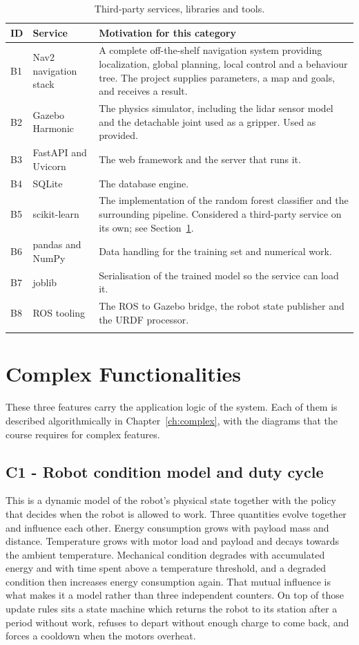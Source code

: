 \documentclass[12pt,a4paper]{report}
\begin{document}
\begin{longtable}{@{}p{}p{}p{}@{}}
\toprule
\textbf{ID} & \textbf{Service} & \textbf{Motivation for this category} \\
\midrule
\endhead
B1 & Nav2 navigation stack & A complete off-the-shelf navigation system providing localization,
global planning, local control and a behaviour tree. The project supplies parameters, a map and
goals, and receives a result. \\
B2 & Gazebo Harmonic & The physics simulator, including the lidar sensor model and the detachable
joint used as a gripper. Used as provided. \\
B3 & FastAPI and Uvicorn & The web framework and the server that runs it. \\
B4 & SQLite & The database engine. \\
B5 & scikit-learn & The implementation of the random forest classifier and the surrounding
pipeline. Considered a third-party service on its own; see
Section~\ref{sec:cat-complex}. \\
B6 & pandas and NumPy & Data handling for the training set and numerical work. \\
B7 & joblib & Serialisation of the trained model so the service can load it. \\
B8 & ROS tooling & The ROS to Gazebo bridge, the robot state publisher and the URDF processor. \\
\bottomrule
\caption{Third-party services, libraries and tools.}
\label{tab:cat-b}
\end{longtable}

\section{Complex Functionalities}
\label{sec:cat-complex}
These three features carry the application logic of the system. Each of them is described
algorithmically in Chapter~\ref{ch:complex}, with the diagrams that the course requires for complex
features.

\subsection*{C1 - Robot condition model and duty cycle}
This is a dynamic model of the robot's physical state together with the policy that decides when
the robot is allowed to work. Three quantities evolve together and influence each other. Energy
consumption grows with payload mass and distance. Temperature grows with motor load and payload and
decays towards the ambient temperature. Mechanical condition degrades with accumulated energy and
with time spent above a temperature threshold, and a degraded condition then increases energy
consumption again. That mutual influence is what makes it a model rather than three independent
counters. On top of those update rules sits a state machine which returns the robot to its station after
a period without work, refuses to depart without enough charge to come back, and forces a cooldown
when the motors overheat.
\end{document}
